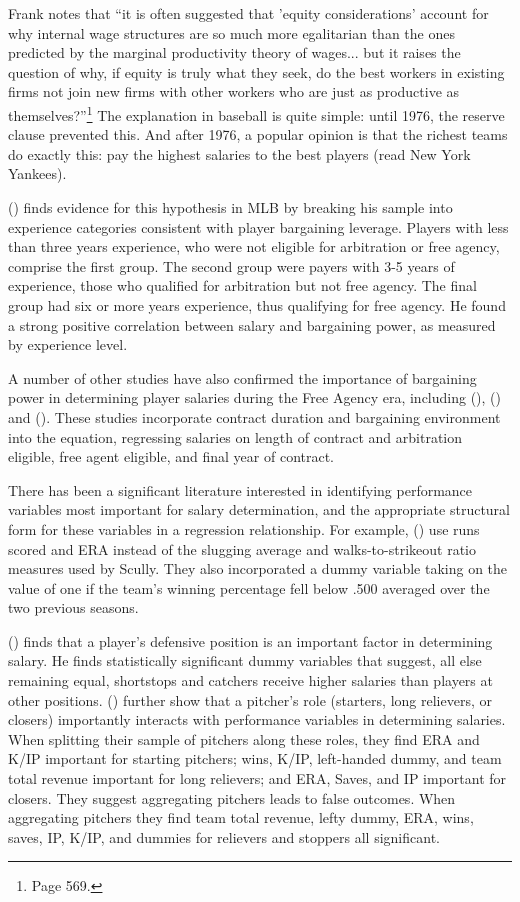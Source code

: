 \documentclass[12pt]{article}
\newcommand{\citee}[1]{\citename{#1} (\citeyear{#1})}
\begin{document}
Frank notes that ``it is often suggested that 'equity considerations' account for why internal wage structures are so much more egalitarian than the ones predicted by the marginal productivity theory of wages...  but it raises the question of why, if equity is truly what they seek, do the best workers in existing firms not join new firms with other workers who are just as productive as themselves?''\footnote{Page 569.}  The explanation in baseball is quite simple: until 1976, the reserve clause prevented this.  And after 1976, a popular opinion is that the richest teams do exactly this: pay the highest salaries to the best players (read New York Yankees).

\citee{zimbalist1} finds evidence for this hypothesis in MLB by breaking his sample into experience categories consistent with player bargaining leverage.  Players with less than three years experience, who were not eligible for arbitration or free agency, comprise the first group.  The second group were payers with 3-5 years of experience, those who qualified for arbitration but not free agency.  The final group had six or more years experience, thus qualifying for free agency.  He found a strong positive correlation between salary and bargaining power, as measured by experience level.  

A number of other studies have also confirmed the importance of bargaining power in determining player salaries during the Free Agency era, including \citee{ko2002}, \citee{kahn1993} and \citee{mr1994}.  These studies incorporate contract duration and bargaining environment into the equation, regressing salaries on length of contract and arbitration eligible, free agent eligible, and final year of contract. 

There has been a significant literature interested in identifying performance variables most important for salary determination, and the appropriate structural form for these variables in a regression relationship.  For example, \citee{mr1994} use runs scored and ERA instead of the slugging average and walks-to-strikeout ratio measures used by Scully.  They also incorporated a dummy variable taking on the value of one if the team's winning percentage fell below .500 averaged over the two previous seasons.

\citee{krautmann1999} finds that a player's defensive position is an important factor in determining salary.  He finds statistically significant dummy variables that suggest, all else remaining equal, shortstops and catchers receive higher salaries than players at other positions.  \citee{kgh2003} further show that a pitcher's role (starters, long relievers, or closers) importantly interacts with performance variables in determining salaries.  When splitting their sample of pitchers along these roles, they find ERA and K/IP important for starting pitchers; wins, K/IP, left-handed dummy, and team total revenue important for long relievers; and ERA, Saves, and IP important for closers.  They suggest aggregating pitchers leads to false outcomes.  When aggregating pitchers they find team total revenue, lefty dummy, ERA, wins, saves, IP, K/IP, and dummies for relievers and stoppers all significant. 
\end{document}
